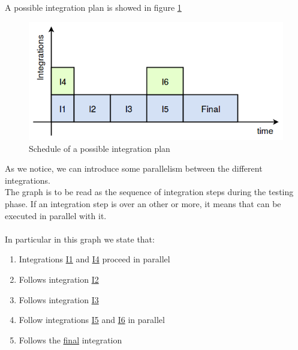 A possible integration plan is showed in figure \ref{fig:schedule}
\begin{figure}[H]
	\centering
	\includegraphics[scale = 0.6]{"../Analysis Documents/schedule"}
	\caption{Schedule of a possible integration plan}
	\label{fig:schedule}
\end{figure}
As we notice, we can introduce some parallelism between the different integrations.\\The graph is to be read as the sequence of integration steps during the testing phase. If an integration step is over an other or more, it means that can be executed in parallel with it.\\
\\
In particular in this graph we state that:
\begin{enumerate}
\item Integrations \hyperref[I1]{I1} and \hyperref[I4]{I4} proceed in parallel
\item Follows integration \hyperref[I2]{I2}
\item Follows integration \hyperref[I3]{I3}
\item Follow integrations \hyperref[I5]{I5} and \hyperref[I6]{I6} in parallel
\item Follows the \hyperref[final]{final} integration
\end{enumerate}